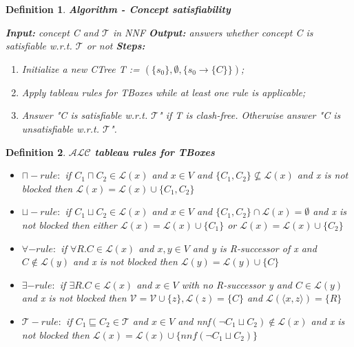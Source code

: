 \documentclass[12pt,a4paper]{article}
\newtheorem{definition}{Definition}[subsection]
\begin{document}
\begin{definition}{\textbf{Algorithm - Concept satisfiability}}	
	
	\noindent \textbf{Input:} concept C and $\mathcal{T}$ in NNF \newline
	\textbf{Output:} answers whether concept C is satisfiable w.r.t. $\mathcal{T}$ or not \newline
	\textbf{Steps:}
	\begin{enumerate}
		\item Initialize a new CTree T := $(\{s_{0}\}, \emptyset, \{s_{0} \rightarrow \{C\}\})$;
		\item Apply tableau rules for TBoxes while at least one rule is applicable;
		\item Answer "C is satisfiable w.r.t. $\mathcal{T}$" if T is clash-free. Otherwise answer "C is unsatisfiable w.r.t. $\mathcal{T}$".
	\end{enumerate}
\end{definition}	

\begin{definition}{\textbf{$\mathcal{ALC}$ tableau rules for TBoxes}}
	\begin{itemize}
		\item $\sqcap-rule:$ if $C_{1} \sqcap C_{2} \in \mathcal{L}(x)$ and $x \in V$ and $\{ C_{1}, C_{2} \} \not \subseteq \mathcal{L}(x)$ and x is not blocked then $\mathcal{L}(x) = \mathcal{L}(x) \cup \{ C_{1}, C_{2} \}$
		
		\item $\sqcup-rule:$ if $C_{1} \sqcup C_{2} \in \mathcal{L}(x)$ and $x \in V$ and $ \{ C_{1}, C_{2} \} \cap \mathcal{L}(x) = \emptyset$ and x is not blocked then either $\mathcal{L}(x) = \mathcal{L}(x) \cup \{ C_{1} \}$ or $\mathcal{L}(x) = \mathcal{L}(x) \cup \{ C_{2} \}$
		
		\item $\forall-rule:$ if $\forall R.C \in \mathcal{L}(x)$ and $x,y \in V$ and y is R-successor of x and $C \not \in \mathcal{L}(y)$ and x is not blocked then $\mathcal{L}(y) = \mathcal{L}(y) \cup \{ C \}$
		
		\item $\exists-rule:$ if $\exists R.C \in \mathcal{L}(x)$ and $x \in V$ with no R-successor y and $C \in \mathcal{L}(y)$ and x is not blocked then $\mathcal{V} = \mathcal{V} \cup \{ z \}, \mathcal{L}(z) = \{ C\}$ and $\mathcal{L}( \langle x, z \rangle ) = \{ R \}$
		
		\item $\mathcal{T}-rule:$ if $C_{1} \sqsubseteq C_{2} \in \mathcal{T}$ and $x \in V$ and nnf$(\neg C_{1} \sqcup C_{2}) \not \in \mathcal{L}(x)$ and x is not blocked then $\mathcal{L}(x) = \mathcal{L}(x) \cup \{ nnf(\neg C_{1} \sqcup C_{2}) \}$
	\end{itemize}
\end{definition}	
\end{document}
